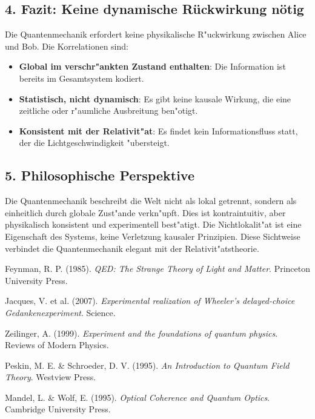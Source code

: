 \documentclass[12pt,a4paper]{article}
\begin{document}
\subsection*{4. Fazit: Keine dynamische Rückwirkung nötig}
Die Quantenmechanik erfordert keine physikalische R"uckwirkung zwischen Alice und Bob. Die Korrelationen sind:
\begin{itemize}
	\item \textbf{Global im verschr"ankten Zustand enthalten}: Die Information ist bereits im Gesamtsystem kodiert.
	\item \textbf{Statistisch, nicht dynamisch}: Es gibt keine kausale Wirkung, die eine zeitliche oder r"aumliche Ausbreitung ben"otigt.
	\item \textbf{Konsistent mit der Relativit"at}: Es findet kein Informationsfluss statt, der die Lichtgeschwindigkeit "ubersteigt.
\end{itemize}

\subsection*{5. Philosophische Perspektive}
Die Quantenmechanik beschreibt die Welt nicht als lokal getrennt, sondern als einheitlich durch globale Zust"ande verkn"upft. Dies ist kontraintuitiv, aber physikalisch konsistent und experimentell best"atigt. Die Nichtlokalit"at ist eine Eigenschaft des Systems, keine Verletzung kausaler Prinzipien. Diese Sichtweise verbindet die Quantenmechanik elegant mit der Relativit"atstheorie.

\begin{thebibliography}{9}
	Feynman, R. P. (1985).
	\textit{QED: The Strange Theory of Light and Matter}.
	Princeton University Press.
	
	Jacques, V. et al. (2007).
	\textit{Experimental realization of Wheeler's delayed-choice Gedankenexperiment}.
	Science.
	
	Zeilinger, A. (1999).
	\textit{Experiment and the foundations of quantum physics}.
	Reviews of Modern Physics.
	
	Peskin, M. E. \& Schroeder, D. V. (1995).
	\textit{An Introduction to Quantum Field Theory}.
	Westview Press.
	
	Mandel, L. \& Wolf, E. (1995).
	\textit{Optical Coherence and Quantum Optics}.
	Cambridge University Press.
	
\end{thebibliography}
\end{document}
